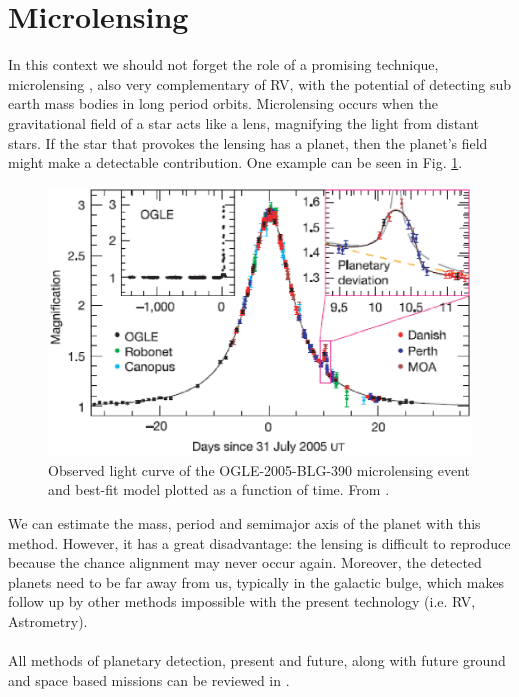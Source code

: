 \documentclass[dvips,12pt,a4paper]{report}
\begin{document}
\section{Microlensing}
\label{microlens}
\indent In this context we should not forget the role of a promising technique, microlensing \citep{Beaulieu-2006}, also very complementary of RV, with the potential of detecting sub earth mass bodies in long period orbits. Microlensing occurs when the gravitational field of a star acts like a lens, magnifying the light from distant stars. If the star that provokes the lensing has a planet, then the planet's field might make a detectable contribution. One example can be seen in Fig. \ref{microlensfig}.
\begin{figure}[h]
\centering
\includegraphics[trim=0cm 0.5cm 0cm 0.5cm,clip,height=5 cm]{pics/microlensing2}
\caption[Example of a microlensing event]{Observed light curve of the OGLE-2005-BLG-390 microlensing event and best-fit model plotted as a function of time. From \citet{Beaulieu-2006}.}
\label{microlensfig}
\end{figure}

We can estimate the mass, period and semimajor axis of the planet with this method. However, it has a great disadvantage: the lensing is difficult to reproduce because the chance alignment may never occur again. Moreover, the detected planets need to be far away from us, typically in the galactic bulge, which makes follow up by other methods impossible with the present technology (i.e. RV, Astrometry).
\\
\\
All methods of planetary detection, present and future, along with future ground and space based missions can be reviewed in \citet{Perryman-2005}.



\end{document}
